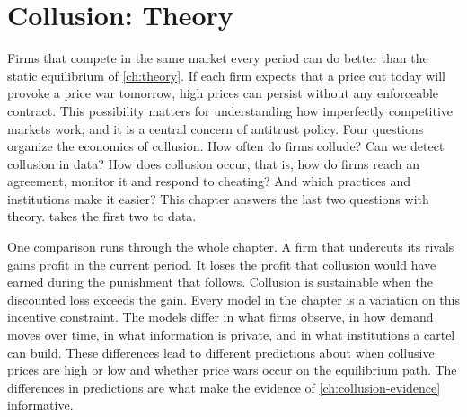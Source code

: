 \chapter{Collusion: Theory}\label{ch:collusion-theory}

Firms that compete in the same market every period can do better than the static equilibrium of
\cref{ch:theory}. If each firm expects that a price cut today will provoke a price war tomorrow, high prices can
persist without any enforceable contract. This possibility matters for understanding how imperfectly competitive
markets work, and it is a central concern of antitrust policy. Four questions organize the economics of collusion.
How often do firms collude? Can we detect collusion in data? How does collusion occur, that is, how do firms reach
an agreement, monitor it and respond to cheating? And which practices and institutions make it easier? This chapter
answers the last two questions with theory.  takes the first two to data.

One comparison runs through the whole chapter. A firm that undercuts its rivals gains profit in the current
period. It loses the profit that collusion would have earned during the punishment that follows. Collusion is
sustainable when the discounted loss exceeds the gain. Every model in the chapter is a variation on this incentive
constraint. The models differ in what firms observe, in how demand moves over time, in what information is
private, and in what institutions a cartel can build. These differences lead to different predictions about when
collusive prices are high or low and whether price wars occur on the equilibrium path. The differences in
predictions are what make the evidence of \cref{ch:collusion-evidence} informative.

